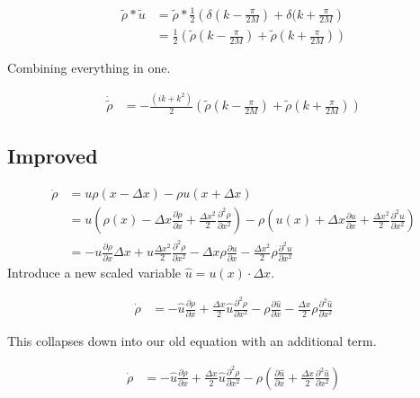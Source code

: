 \documentclass[a4paper]{article}
\begin{document}
\begin{align*}
\tilde{\rho} * \tilde{u} & = \tilde{\rho} * \frac{1}{2} \left( \delta ( k - \frac{\pi}{2 M} ) + \delta ( k + \frac{\pi}{2 M} \right) \\
& = \frac{1}{2} \left( \tilde{\rho} ( k - \frac{\pi}{2 M} ) + \tilde{\rho} ( k + \frac{\pi}{2 M} ) \right)
\end{align*}

Combining everything in one. 

\begin{align*}
\dot{\tilde{\rho}} & = - \frac{(ik + k ^2 )}{2}  \left( \tilde{\rho} ( k - \frac{\pi}{2 M} ) + \tilde{\rho} ( k + \frac{\pi}{2 M} ) \right) 
\end{align*}

\newpage

\subsection*{Improved}

\begin{align*}
\dot{\rho} & = u \rho(x - \Delta x) - \rho u(x + \Delta x) \\
& = u \left( \rho (x) - \Delta x \frac{\partial \rho}{\partial x} + \frac{\Delta x ^2}{2} \frac{\partial ^2 \rho}{\partial x^2} \right) - \rho \left( u(x) + \Delta x \frac{\partial u }{\partial x} + \frac{\Delta x ^2}{2} \frac{\partial ^2 u}{\partial x ^2} \right) \\ 
& = - u \frac{\partial \rho}{\partial x} \Delta x + u \frac{\Delta x ^2}{2} \frac{\partial ^2 \rho}{\partial x ^2} - \Delta x \rho \frac{\partial u}{\partial x} - \frac{\Delta x ^2}{2} \rho \frac{\partial ^2 u}{\partial x ^2}
\end{align*}
Introduce a new scaled variable $\hat{u} = u(x) \cdot \Delta x$. 

\begin{align*}
\dot{\rho} & = - \hat{u} \frac{\partial \rho}{\partial x} + \frac{\Delta x}{2} \hat{u} \frac{\partial ^2 \rho}{\partial x ^2} - \rho \frac{\partial \hat{u}}{\partial x} - \frac{\Delta x }{2} \rho \frac{\partial ^2 \hat{u}}{\partial x ^2}
\end{align*}

This collapses down into our old equation with an additional term. 

\begin{align*}
\dot{\rho} & = - \hat{u} \frac{\partial \rho}{\partial x} + \frac{\Delta x}{2} \hat{u} \frac{\partial ^2 \rho}{\partial x ^2} - \rho \left( \frac{\partial \hat{u}}{\partial x} + \frac{\Delta x }{2} \frac{\partial ^2 \hat{u}}{\partial x^2} \right) 
\end{align*}
\end{document}
